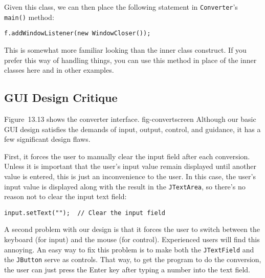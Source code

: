 \noindent Given this class, we can then place the following statement
in {\tt Converter}'s {\tt main()} method:

\begin{jjjlisting}
\begin{lstlisting}
f.addWindowListener(new WindowCloser());
\end{lstlisting}
\end{jjjlisting}

\noindent This is somewhat more familiar looking than the inner class
construct. If you prefer this way of handling things, you can use this
method in place of the inner classes here and in other examples.


\pagebreak
\subsection{GUI Design Critique}
\noindent Figure~13.13 shows the converter interface.
{fig-convertscreen}
Although our basic GUI design satisfies the demands of input, output,
control, and guidance, it has a few significant design flaws.

First, it forces the user to manually clear the input field after each
conversion.  Unless it is important that the user's input value remain
displayed until another value is entered, this is just an
inconvenience to the user.  In this case, the user's input value is
displayed along with the result in the {\tt JTextArea}, so there's no
reason not to clear the input text field:

\begin{jjjlisting}
\begin{lstlisting}
input.setText("");  // Clear the input field
\end{lstlisting}
\end{jjjlisting}


A second problem with our design is that it forces the user to switch
between the keyboard (for input) and the mouse (for
control). Experienced users will find this annoying.   An easy way to
fix this problem is to make both the {\tt JTextField} and the
{\tt JButton} serve as controls.  That way, to get the program to do the
conversion, the user can just press the Enter key after typing a
number into the text field.


